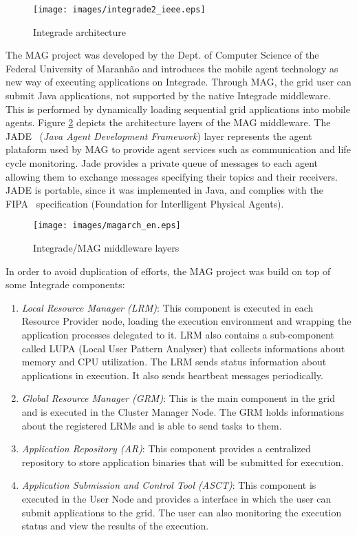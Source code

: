 \documentclass[times, 10pt, twocolumn]{article}
\begin{document}
\begin{figure}[th]
\centering \texttt{[image: images/integrade2\_ieee.eps]}
\caption{Integrade architecture}
\label{fig:integrade}
\end{figure}


The MAG project was developed by the Dept. of Computer Science of the Federal
University of Maranh\~{a}o and introduces the mobile agent technology as new way
of executing applications on Integrade. Through MAG, the grid user can submit
Java applications, not supported by the native Integrade middleware. This is
performed by dynamically loading sequential grid applications into mobile
agents. Figure \ref{fig:magarch} depicts the architecture layers of the MAG middleware.
The JADE~\cite{jade} (\emph{Java Agent Development Framework}) layer represents the agent
plataform used by MAG to provide agent services such as communication and life
cycle monitoring. Jade provides a private queue of messages to each agent
allowing them to exchange messages specifying their topics and their receivers.
JADE is portable, since it was implemented in Java, and complies with the
FIPA~\cite{fipa} specification (Foundation for Interlligent Physical Agents).

\begin{figure}[th]
\centering \texttt{[image: images/magarch\_en.eps]}
\caption{Integrade/MAG middleware layers}
\label{fig:magarch}
\end{figure}


In order to avoid duplication of efforts, the MAG project was build on top of
some Integrade components:

\begin{enumerate}

    \item \emph{Local Resource Manager (LRM)}: This component is executed in
each Resource Provider node, loading the execution environment and wrapping the
application processes delegated to it. LRM also contains a sub-component called
LUPA (Local User Pattern Analyser) that collects informations about memory and
CPU utilization. The LRM sends status information about applications in
execution. It also sends heartbeat messages periodically.

    \item \emph{Global Resource Manager (GRM)}: This is the main component in
the grid and is executed in the Cluster Manager Node. The GRM holds
informations about the registered LRMs and is able to send tasks to them.

    \item \emph{Application Repository (AR)}: This component provides a
centralized repository to store application binaries that will be submitted for
execution.

    \item \emph{Application Submission and Control Tool (ASCT)}: This component
is executed in the User Node and provides a interface in which the user can
submit applications to the grid. The user can also monitoring the execution
status and view the results of the execution.

\end{enumerate}
\end{document}
